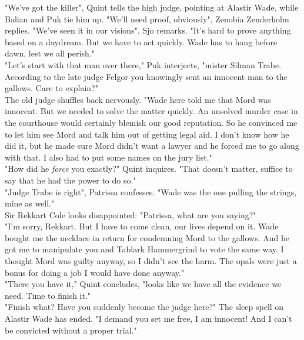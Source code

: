 "We've got the killer", Quint tells the high judge, pointing at Alastir Wade, while Balian and Puk tie him up. "We'll need proof, obviously", Zenobia Zenderholm replies. "We've seen it in our visions", Sjo remarks. "It's hard to prove anything based on a daydream. But we have to act quickly. Wade has to hang before dawn, lest we all perish."\\

"Let's start with that man over there," Puk interjects, "mister Silman Trabe. According to the late judge Felgor you knowingly sent an innocent man to the gallows. Care to explain?"\\

The old judge shuffles back nervously. "Wade here told me that Mord was innocent. But we needed to solve the matter quickly. An unsolved murder case in the courthouse would certainly blemish our good reputation. So he convinced me to let him see Mord and talk him out of getting legal aid. I don't know how he did it, but he made sure Mord didn't want a lawyer and he forced me to go along with that. I also had to put some names on the jury list."\\

"How did he {\itshape force} you exactly?" Quint inquires. "That doesn't matter, suffice to say that he had the power to do so."\\

"Judge Trabe is right", Patrissa confesses. "Wade was the one pulling the strings, mine as well."\\

Sir Rekkart Cole looks disappointed: "Patrissa, what are you saying?"\\

"I'm sorry, Rekkart. But I have to come clean, our lives depend on it. Wade bought me the necklace in return for condemning Mord to the gallows. And he got me to manipulate you and Tablark Hammergrind to vote the same way. I thought Mord was guilty anyway, so I didn't see the harm. The opals were just a bonus for doing a job I would have done anyway."\\

"There you have it," Quint concludes, "looks like we have all the evidence we need. Time to finish it."\\

"Finish what? Have you suddenly become the judge here?" The sleep spell on Alastir Wade has ended. "I demand you set me free, I am innocent! And I can't be convicted without a proper trial."\\

